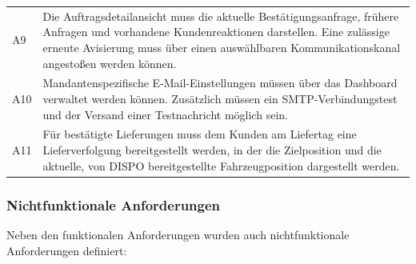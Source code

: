 \begin{table}[htbp]
\begin{tabularx}{\textwidth}{@{}p{}X@{}}
        A9 &
        Die Auftragsdetailansicht muss die aktuelle
        Bestätigungsanfrage, frühere Anfragen und vorhandene
        Kundenreaktionen darstellen. Eine zulässige erneute
        Avisierung muss über einen auswählbaren
        Kommunikationskanal angestoßen werden können. \\

        A10 &
        Mandantenspezifische E-Mail-Einstellungen müssen über
        das Dashboard verwaltet werden können. Zusätzlich müssen
        ein SMTP-Verbindungstest und der Versand einer
        Testnachricht möglich sein. \\

        A11 &
        Für bestätigte Lieferungen muss dem Kunden am Liefertag eine
        Lieferverfolgung bereitgestellt werden, in der die Zielposition
        und die aktuelle, von DISPO bereitgestellte Fahrzeugposition
        dargestellt werden. \\
        \bottomrule
    \end{tabularx}
\end{table}

\clearpage

\subsubsection{Nichtfunktionale Anforderungen}

Neben den funktionalen Anforderungen wurden auch nichtfunktionale Anforderungen definiert:

